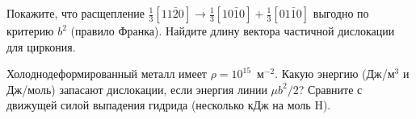 \begin{exercise}
Покажите, что расщепление $\tfrac13[11\bar20]\to\tfrac13[10\bar10]+\tfrac13[01\bar10]$ выгодно по критерию $b^2$ (правило
Франка). Найдите длину вектора частичной дислокации для циркония.
\end{exercise}

\begin{exercise}
Холоднодеформированный металл имеет $\rho = 10^{15}$~м$^{-2}$. Какую энергию (Дж/м$^3$ и Дж/моль) запасают дислокации,
если энергия линии $\mu b^2/2$? Сравните с движущей силой выпадения гидрида (несколько кДж на моль H).
\end{exercise}

